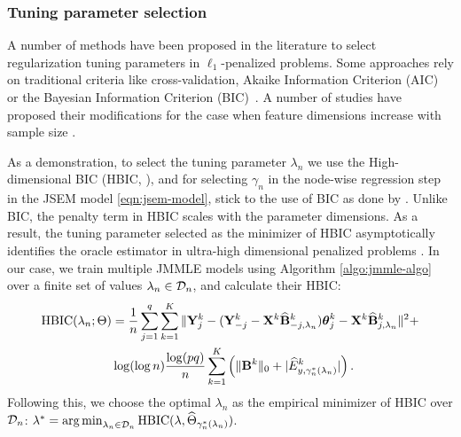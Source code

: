 \subsubsection{Tuning parameter selection}
{\colb
A number of methods have been proposed in the literature to select regularization tuning parameters in $\ell_1$-penalized problems. Some approaches rely on traditional criteria like cross-validation, Akaike Information Criterion (AIC)~\citep{DanaherEtal14} or the Bayesian Information Criterion (BIC)~\citep{LinEtal16,MaMichailidis15}. A number of studies have proposed their modifications for the case when feature dimensions increase with sample size \citep{FoygelDrton10,GaoEtal12,KimKwonChoi12}.

As a demonstration, to select the tuning parameter $\lambda_n$ we use the High-dimensional BIC (HBIC, \citet{KimKwonChoi12, WangKimLi13}), and for selecting $\gamma_n$ in the node-wise regression step in the JSEM model \eqref{eqn:jsem-model}, stick to the use of BIC as done by \citet{MaMichailidis15}. Unlike BIC, the penalty term in HBIC scales with the parameter dimensions. As a result, the tuning parameter selected as the minimizer of HBIC asymptotically identifies the oracle estimator in ultra-high dimensional penalized problems \citep{FanTang13, WangKimLi13}. In our case, we train multiple JMMLE models using Algorithm \ref{algo:jmmle-algo} over a finite set of values $\lambda_n \in {\cal{D}}_n$, and calculate their HBIC:
%
\begin{align*}
\text{HBIC} (\lambda_n; \Theta) &=
\frac{1}{n} \sum_{j=1}^q \sum_{k=1}^K \| {\mathbf{Y}}^k_j - ({\mathbf{Y}}_{-j}^k - {\mathbf{X}}^k \widehat {{\mathbf{B}}}_{-j,\lambda_n}^k ) {\boldsymbol{\theta}}_j^{k } - {\mathbf{X}}^k \widehat {{\mathbf{B}}}_{j,\lambda_n}^k \|^2 +\\
& \log (\log n) \frac{\log (pq)}{n} \sum_{k=1}^K
\left( \| {\mathbf{B}}^k \|_0 + | \widehat E_{y, \gamma_n^* (\lambda_n)}^k| \right).
\end{align*}
%
Following this, we choose the optimal $\lambda_n$ as the empirical minimizer of HBIC over ${\cal{D}}_n$: $
\lambda^* = \operatorname*{arg\,min}_{\lambda_n \in {\cal{D}}_n} \text{HBIC} (\lambda, \widehat \Theta_{\gamma_n^*(\lambda_n)})
$.
}

